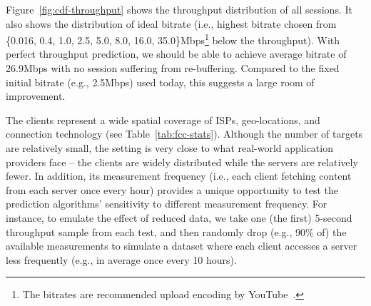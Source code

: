 Figure~\ref{fig:cdf-throughput} shows the throughput distribution of all sessions. It also shows the distribution of ideal bitrate (i.e., highest bitrate chosen from \{0.016, 0.4, 1.0, 2.5, 5.0, 8.0, 16.0, 35.0\}Mbps\footnote{The bitrates are recommended upload encoding by YouTube~\cite{youtube-bitrates}.} below the throughput). With perfect throughput prediction, we should be able to achieve average bitrate of 26.9Mbps with no session suffering from re-buffering. Compared to the fixed initial bitrate (e.g., 2.5Mbps) used today, this suggests a large room of improvement.


The clients
represent a wide spatial coverage of ISPs, geo-locations, and connection technology (see Table~\ref{tab:fcc-stats}). Although the number of targets are relatively small, the setting is very close to what real-world application providers face -- the clients are widely distributed while the servers are relatively fewer. 
In addition, its measurement frequency (i.e., each client fetching content from each server once every hour) provides a unique opportunity to test the prediction algorithms' sensitivity to different measurement frequency. 
For instance, to emulate the effect of reduced data, we take one (the first) 5-second throughput sample from each test, and then randomly drop (e.g., 90\% of) the available measurements to simulate a dataset where each client accesses a server less frequently (e.g., in average once every 10 hours).




